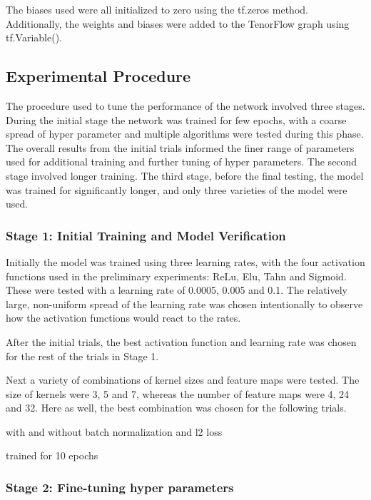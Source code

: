 \documentclass[]{article}
\begin{document}
The biases used were all initialized to zero using the tf.zeros method. Additionally, the weights and biases were added to the TenorFlow graph using  tf.Variable().

\subsection{Experimental Procedure}

The procedure used to tune the performance of the network involved three stages. During the initial stage the network was trained for few epochs, with a coarse spread of hyper parameter and multiple algorithms were tested during this phase. The overall results from the initial trials informed the finer range of parameters used for additional training and further tuning of hyper parameters. The second stage involved longer training. The third stage, before the final testing, the model was trained for significantly longer, and only three varieties of the model were used. 

\subsubsection{Stage 1: Initial Training and Model Verification}

Initially the model was trained using three learning rates, with the four activation functions used in the preliminary experiments: ReLu, Elu, Tahn and Sigmoid. These were tested with a learning rate of 0.0005, 0.005 and 0.1. The relatively large, non-uniform spread of the learning rate was chosen intentionally to observe how the activation functions would react to the rates.

After the initial trials, the best activation function and learning rate was chosen for the rest of the trials in Stage 1. 

Next a variety of combinations of kernel sizes and feature maps were tested. The size of kernels were 3, 5 and 7, whereas the number of feature maps were 4, 24 and 32. Here as well, the best combination was chosen for the following trials.


with and without batch normalization and l2 loss

trained for 10 epochs


\subsubsection{Stage 2: Fine-tuning hyper parameters}
\end{document}
